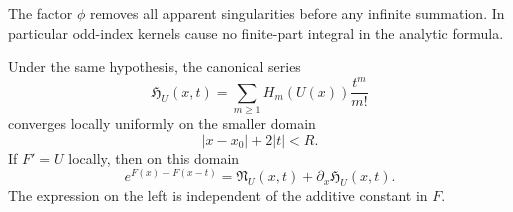 The factor $\phi$ removes all apparent singularities before any
infinite summation. In particular odd-index kernels cause no
finite-part integral in the analytic formula.

\begin{theorem}
\label{hp:analyticH}
Under the same hypothesis, the canonical series
\begin{equation}\label{hp:Hanalytic}
           \mathfrak H_U(x,t)=\sum_{m\ge1}H_m(U(x))\frac{t^m}{m!}
\end{equation}
converges locally uniformly on the smaller domain
\begin{equation}\label{hp:primitivedomain}
                        |x-x_0|+2|t|<R.
\end{equation}
If $F'=U$ locally, then on this domain
\begin{equation}\label{hp:translation}
 \boxed{\displaystyle
 e^{F(x)-F(x-t)}=\mathfrak N_U(x,t)
                               +\partial_x\mathfrak H_U(x,t).}
\end{equation}
The expression on the left is independent of the additive constant
in $F$.
\end{theorem}

